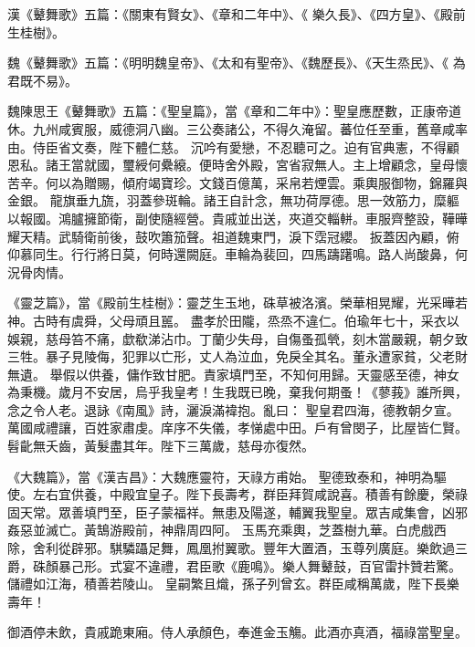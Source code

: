 
\begin{pinyinscope}

 漢《鼙舞歌》五篇：《關東有賢女》、《章和二年中》、《
 樂久長》、《四方皇》、《殿前生桂樹》。



 魏《鼙舞歌》五篇：《明明魏皇帝》、《太和有聖帝》、《魏歷長》、《天生烝民》、《
 為君既不易》。



 魏陳思王《鼙舞歌》五篇：《聖皇篇》，當《章和二年中》：聖皇應歷數，正康帝道休。九州咸賓服，威德洞八幽。三公奏諸公，不得久淹留。蕃位任至重，舊章咸率由。侍臣省文奏，陛下體仁慈。
 沉吟有愛戀，不忍聽可之。迫有官典憲，不得顧恩私。諸王當就國，璽綬何纍縗。便時舍外殿，宮省寂無人。主上增顧念，皇母懷苦辛。何以為贈賜，傾府竭寶珍。文錢百億萬，采帛若煙雲。乘輿服御物，錦羅與金銀。
 龍旗垂九旒，羽蓋參斑輪。諸王自計念，無功荷厚德。思一效筋力，糜軀以報國。鴻臚擁節衛，副使隨經營。貴戚並出送，夾道交輜軿。車服齊整設，鞾曄耀天精。武騎衛前後，鼓吹簫笳聲。祖道魏東門，淚下霑冠纓。
 扳蓋因內顧，俯仰慕同生。行行將日莫，何時還闕庭。車輪為裴回，四馬躊躇鳴。路人尚酸鼻，何況骨肉情。



 《靈芝篇》，當《殿前生桂樹》：靈芝生玉地，硃草被洛濱。榮華相晃耀，光采曄若神。古時有虞舜，父母頑且嚚。
 盡孝於田隴，烝烝不違仁。伯瑜年七十，采衣以娛親，慈母笞不痛，歔欷涕沾巾。丁蘭少失母，自傷蚤孤煢，刻木當嚴親，朝夕致三牲。暴子見陵侮，犯罪以亡形，丈人為泣血，免戾全其名。董永遭家貧，父老財無遺。
 舉假以供養，傭作致甘肥。責家填門至，不知何用歸。天靈感至德，神女為秉機。歲月不安居，烏乎我皇考！生我既已晚，棄我何期蚤！《蓼莪》誰所興，念之令人老。退詠《南風》詩，灑淚滿褘抱。亂曰：
 聖皇君四海，德教朝夕宣。萬國咸禮讓，百姓家肅虔。庠序不失儀，孝悌處中田。戶有曾閔子，比屋皆仁賢。髫齔無夭齒，黃髮盡其年。陛下三萬歲，慈母亦復然。



 《大魏篇》，當《漢吉昌》：大魏應靈符，天祿方甫始。
 聖德致泰和，神明為驅使。左右宜供養，中殿宜皇子。陛下長壽考，群臣拜賀咸說喜。積善有餘慶，榮祿固天常。眾善填門至，臣子蒙福祥。無患及陽遂，輔翼我聖皇。眾吉咸集會，凶邪姦惡並滅亡。黃鵠游殿前，神鼎周四阿。
 玉馬充乘輿，芝蓋樹九華。白虎戲西除，舍利從辟邪。騏驎躡足舞，鳳凰拊翼歌。豐年大置酒，玉尊列廣庭。樂飲過三爵，硃顏暴己形。式宴不違禮，君臣歌《鹿鳴》。樂人舞鼙鼓，百官雷抃贊若驚。儲禮如江海，積善若陵山。
 皇嗣繁且熾，孫子列曾玄。群臣咸稱萬歲，陛下長樂壽年！



 御酒停未飲，貴戚跪東廂。侍人承顏色，奉進金玉觴。此酒亦真酒，福祿當聖皇。




\end{pinyinscope}
